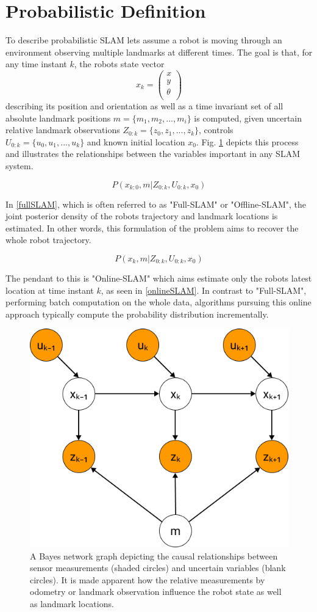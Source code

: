 \section{Probabilistic Definition}
To describe probabilistic SLAM lets assume a robot is moving through an environment observing multiple landmarks at different times. 
The goal is that, for any time instant $ k $, the robots state vector 
\[ x_{k} = 
\begin{pmatrix}
	x \\
	y \\
	\theta \\
\end{pmatrix}
\] describing its position and orientation as well as a time invariant set of all absolute landmark positions 
$ m = \{ m_{1}, m_{2}, ..., m_{i} \}$ 
is computed, given uncertain relative landmark observations $ Z_{0:k} = \{z_{0}, z_{1}, ..., z_{k}\}$, controls $ U_{0:k} = \{u_{0}, u_{1}, ..., u_{k}\}$ and known initial location $ x_{0} $. Fig. \ref{fig:slamGraphical} depicts this process and illustrates the relationships between the variables important in any SLAM system. 

\begin{equation}\label{fullSLAM}
	P(x_{k:0}, m | Z_{0:k}, U_{0:k}, x_{0})
\end{equation}

In \ref{fullSLAM}, which is often referred to as "Full-SLAM" or "Offline-SLAM", the joint posterior density of the robots trajectory and landmark locations is estimated. In other words, this formulation of the problem aims to recover the whole robot trajectory.

\begin{equation}\label{onlineSLAM}
	P(x_{k}, m | Z_{0:k}, U_{0:k}, x_{0})
\end{equation}

The pendant to this is "Online-SLAM" which aims estimate only the robots latest location at time instant $ k $, as seen in \ref{onlineSLAM}. In contrast to "Full-SLAM", performing batch computation on the whole data, algorithms pursuing this online approach typically compute the probability distribution incrementally. 

\begin{figure}
	\centering
	\includegraphics[width=0.4\linewidth]{img/SlamGraphical}
	\caption{
		A Bayes network graph depicting the causal relationships between sensor measurements (shaded circles) and uncertain variables (blank circles). It is made apparent how the relative measurements by odometry or landmark observation influence the robot state as well as landmark locations. 
	}
	\label{fig:slamGraphical}
\end{figure}


